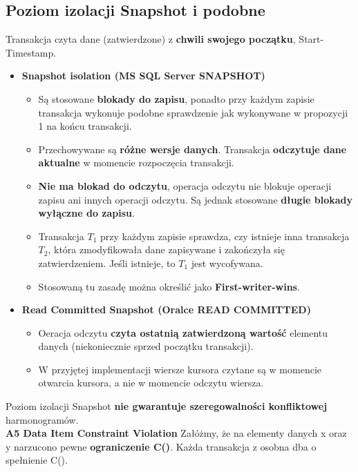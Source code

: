 \documentclass[a4paper]{article}
\begin{document}
    \subsection{Poziom izolacji Snapshot i podobne}
    Transakcja czyta dane (zatwierdzone) z \textbf{chwili swojego
    początku}, Start-Timestamp. \\

    \begin{itemize}
        \item \textbf{Snapshot isolation (MS SQL Server SNAPSHOT)}
        \begin{itemize}
            \item Są stosowane \textbf{blokady do zapisu}, ponadto przy każdym zapisie transakcja wykonuje podobne sprawdzenie jak wykonywane w propozycji 1 na końcu transakcji.
            \item Przechowywane są \textbf{różne wersje danych}. Transakcja \textbf{odczytuje dane aktualne} w momencie rozpoczęcia transakcji.
            \item \textbf{Nie ma blokad do odczytu}, operacja odczytu nie blokuje operacji zapisu ani innych operacji odczytu. Są jednak stosowane \textbf{długie blokady wyłączne do zapisu}.
            \item Transakcja $T_1$ przy każdym zapisie sprawdza, czy istnieje inna transakcja $T_2$, która zmodyfikowała dane zapisywane i zakończyła się zatwierdzeniem. Jeśli istnieje, to $T_1$ jest wycofywana.
            \item Stosowaną tu zasadę można określić jako \textbf{First-writer-wins}.
        \end{itemize}
        \item \textbf{Read Committed Snapshot (Oralce READ COMMITTED)}
        \begin{itemize}
            \item Oeracja odczytu \textbf{czyta ostatnią zatwierdzoną wartość} elementu danych (niekoniecznie sprzed początku transakcji).
            \item W przyjętej implementacji wiersze kursora czytane są w momencie otwarcia kursora, a nie w momencie odczytu wiersza.
        \end{itemize}
    \end{itemize}

    Poziom izolacji Snapshot \textbf{nie gwarantuje szeregowalności konfliktowej} harmonogramów.\\

    \textbf{A5 Data Item Constraint Violation}
    Załóżmy, że na elementy danych x oraz y narzucono pewne \textbf{ograniczenie C()}. Każda transakcja z osobna dba o spełnienie C().\\
\end{document}
